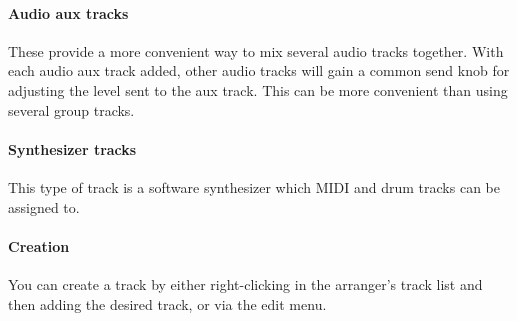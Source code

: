 \documentclass[a4paper]{report}
\begin{document}
\paragraph{Audio aux tracks} \label{aux_tracks} 
These provide a more convenient way to mix several audio tracks
together. With each audio aux track added, other audio tracks will
gain a common send knob for adjusting the level sent to the aux
track. This can be more convenient than using several group tracks.

\paragraph{Synthesizer tracks}
This type of track is a software synthesizer which MIDI and drum tracks
can be assigned to.

\paragraph{Creation}
You can create a track by either right-clicking in the arranger's track   %
list and then adding the desired track, or via the edit menu.
\end{document}
